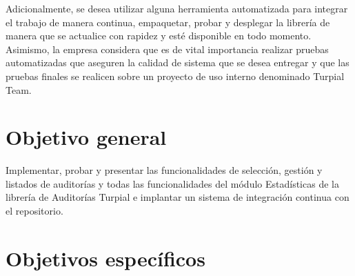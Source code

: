 Adicionalmente, se desea utilizar alguna herramienta automatizada para integrar
el trabajo de manera continua, empaquetar, probar y desplegar la librería de
manera que se actualice con rapidez y esté disponible en todo momento.
Asimismo, la empresa considera que es de vital importancia realizar pruebas
automatizadas que aseguren la calidad de sistema que se desea entregar y que
las pruebas finales se realicen sobre un proyecto de uso interno denominado
Turpial Team.

\section{Objetivo general}

Implementar, probar y presentar las funcionalidades de selección, gestión y
listados de auditorías y todas las funcionalidades del módulo Estadísticas de
la librería de Auditorías Turpial e implantar un sistema de integración
continua con el repositorio.

\section{Objetivos específicos}
